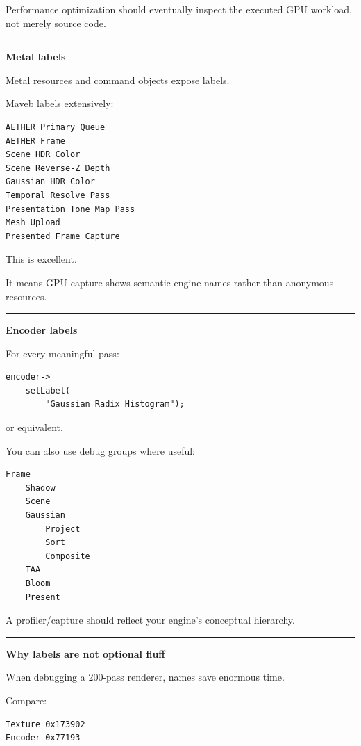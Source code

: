 Performance optimization should eventually inspect the executed GPU workload, not merely source code.

\begin{center}\rule{0.5\linewidth}{0.5pt}\end{center}

\textbf{Metal labels}

Metal resources and command objects expose labels.

Maveb labels extensively:

\begin{verbatim}
AETHER Primary Queue
AETHER Frame
Scene HDR Color
Scene Reverse-Z Depth
Gaussian HDR Color
Temporal Resolve Pass
Presentation Tone Map Pass
Mesh Upload
Presented Frame Capture
\end{verbatim}

This is excellent.

It means GPU capture shows semantic engine names rather than anonymous resources.

\begin{center}\rule{0.5\linewidth}{0.5pt}\end{center}

\textbf{Encoder labels}

For every meaningful pass:

\begin{verbatim}
encoder->
    setLabel(
        "Gaussian Radix Histogram");
\end{verbatim}

or equivalent.

You can also use debug groups where useful:

\begin{verbatim}
Frame
    Shadow
    Scene
    Gaussian
        Project
        Sort
        Composite
    TAA
    Bloom
    Present
\end{verbatim}

A profiler/capture should reflect your engine's conceptual hierarchy.

\begin{center}\rule{0.5\linewidth}{0.5pt}\end{center}

\textbf{Why labels are not optional fluff}

When debugging a 200-pass renderer, names save enormous time.

Compare:

\begin{verbatim}
Texture 0x173902
Encoder 0x77193
\end{verbatim}


